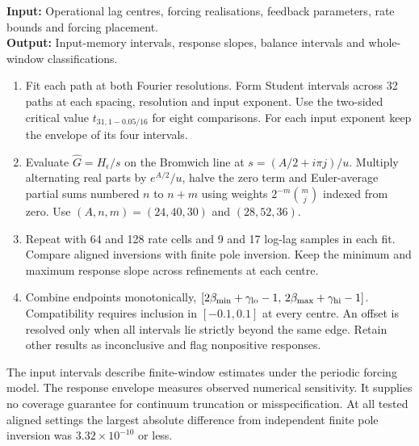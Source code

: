 \documentclass[11pt]{article}
\begin{document}
\begin{algorithm}[htbp]
\caption{Independent forcing-memory and integrated-response estimates}
\small\textbf{Input:} Operational lag centres, forcing realisations, feedback parameters, rate bounds and forcing placement.\\
\textbf{Output:} Input-memory intervals, response slopes, balance intervals and whole-window classifications.
\begin{enumerate}\setlength{\itemsep}{0.1em}
\item Fit each path at both Fourier resolutions. Form Student intervals across 32 paths at each spacing, resolution and input exponent. Use the two-sided critical value \(t_{31,1-0.05/16}\) for eight comparisons. For each input exponent keep the envelope of its four intervals.
\item Evaluate \(\widehat G=H_\epsilon/s\) on the Bromwich line at \(s=(A/2+i\pi j)/u\). Multiply alternating real parts by \(e^{A/2}/u\), halve the zero term and Euler-average partial sums numbered \(n\) to \(n+m\) using weights \(2^{-m}\binom{m}{j}\) indexed from zero. Use \((A,n,m)=(24,40,30)\) and \((28,52,36)\).
\item Repeat with 64 and 128 rate cells and 9 and 17 log-lag samples in each fit. Compare aligned inversions with finite pole inversion. Keep the minimum and maximum response slope across refinements at each centre.
\item Combine endpoints monotonically, \([2\beta_{\min}+\gamma_{\rm lo}-1,\,2\beta_{\max}+\gamma_{\rm hi}-1]\). Compatibility requires inclusion in \([-0.1,0.1]\) at every centre. An offset is resolved only when all intervals lie strictly beyond the same edge. Retain other results as inconclusive and flag nonpositive responses.
\end{enumerate}
\end{algorithm}
The input intervals describe finite-window estimates under the periodic
forcing model. The response envelope measures observed numerical
sensitivity. It supplies no coverage guarantee for continuum truncation
or misspecification. At all tested aligned settings the largest absolute
difference from independent finite pole inversion was
\(3.32\times10^{-10}\) or less.
\end{document}
